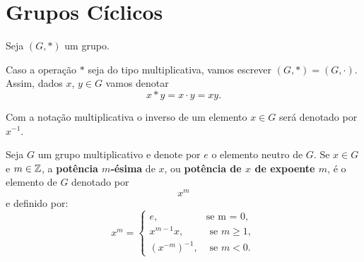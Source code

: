 \section{Grupos Cíclicos}

Seja $(G, *)$ um grupo.

Caso a operação $*$ seja do tipo multiplicativa, vamos escrever $(G, *) = (G, \cdot)$. Assim, dados $x$, $y \in G$ vamos denotar
\[
    x * y = x \cdot y = xy.
\]

Com a notação multiplicativa o inverso de um elemento $x \in G$ será denotado por $x^{-1}$.

\begin{definicao}
    Seja $G$ um grupo multiplicativo e denote por $e$ o elemento neutro de $G$. Se $x \in G$ e $m \in \mathbb{Z}$, a \textbf{potência $m$-ésima} de $x$, ou \textbf{potência de $x$ de expoente $m$}, é o elemento de $G$ denotado por
        \[
            x^m
        \]
        e definido por:
        \[
            x^m = \begin{cases}
                    e, & \mbox{se m = 0},\\
                    x^{m-1}x, & \mbox{ se } m \ge 1,\\
                    (x^{-m})^{-1}, & \mbox{ se } m < 0.
                   \end{cases}
        \]
\end{definicao}

